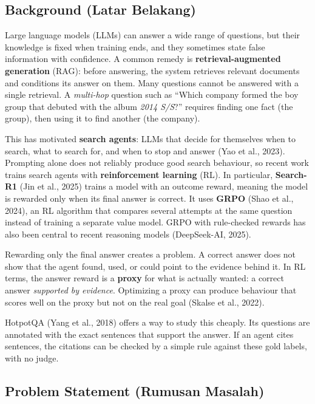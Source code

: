 
\subsection{Background (Latar Belakang)}\label{sec:1.1}

Large language models (LLMs) can answer a wide range of questions, but
their knowledge is fixed when training ends, and they sometimes state
false information with confidence. A common remedy is
\textbf{retrieval-augmented generation} (RAG): before answering, the
system retrieves relevant documents and conditions its answer on them.
Many questions cannot be answered with a single retrieval. A
\emph{multi-hop} question such as ``Which company formed the boy group
that debuted with the album \emph{2014 S/S}?'' requires finding one fact
(the group), then using it to find another (the company).

This has motivated \textbf{search agents}: LLMs that decide for
themselves when to search, what to search for, and when to stop and
answer (Yao et al., 2023). Prompting alone does not reliably produce
good search behaviour, so recent work trains search agents with
\textbf{reinforcement learning} (RL). In particular, \textbf{Search-R1}
(Jin et al., 2025) trains a model with an outcome reward, meaning the
model is rewarded only when its final answer is correct. It uses
\textbf{GRPO} (Shao et al., 2024), an RL algorithm that compares several
attempts at the same question instead of training a separate value
model. GRPO with rule-checked rewards has also been central to recent
reasoning models (DeepSeek-AI, 2025).

Rewarding only the final answer creates a problem. A correct answer does
not show that the agent found, used, or could point to the evidence
behind it. In RL terms, the answer reward is a \textbf{proxy} for what
is actually wanted: a correct answer \emph{supported by evidence}.
Optimizing a proxy can produce behaviour that scores well on the proxy
but not on the real goal (Skalse et al., 2022).

HotpotQA (Yang et al., 2018) offers a way to study this cheaply. Its
questions are annotated with the exact sentences that support the
answer. If an agent cites sentences, the citations can be checked by a
simple rule against these gold labels, with no judge.

\subsection{Problem Statement (Rumusan Masalah)}\label{sec:1.2}

